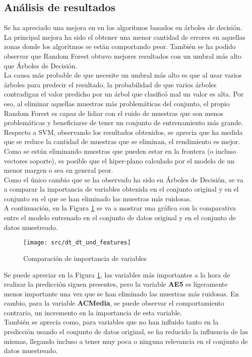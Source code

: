 \subsection{Análisis de resultados}
Se ha apreciado una mejora en en los algoritmos basados en árboles de decisión. La principal mejora ha sido el obtener una menor cantidad de errores en aquellas zonas donde los algoritmos se están comportando peor. También se ha podido observar que Random Forest obtuvo mejores resultados con un umbral más alto que Árboles de Decisión. \\
La causa más probable de que necesite un umbral más alto es que al usar varios árboles para predecir el resultado, la probabilidad de que varios árboles contradigan el valor predicho por un árbol que clasificó mal un valor es alta. Por eso, al eliminar aquellas muestras más problemáticas del conjunto, el propio Random Forest es capaz de lidiar con el ruido de muestras que son menos problemáticas y beneficiarse de tener un conjunto de entrenamiento más grande.\\
\linebreak
Respecto a SVM, observando los resultados obtenidos, se aprecia que ha medida que se reduce la cantidad de muestras que se eliminan, el rendimiento es mejor.
Como se están eliminando muestras que pueden estar en la frontera (o incluso vectores soporte), es posible que el hiper-plano calculado por el modelo de un menor margen o sea en general peor.\\
\linebreak
Como el único cambio que se ha observado ha sido en Árboles de Decisión, se va a comparar la importancia de variables obtenida en el conjunto original y en el conjunto en el que se han eliminado las muestras más ruidosas.\\
\clearpage
A continuación, en la Figura \ref{fig:cmp_fi_dt} se va a mostrar una gráfica con la comparativa entre el modelo entrenado en el conjunto de datos original y en el conjunto de datos muestreado.
\begin{figure}[H]
	\centering
	\texttt{[image: src/dt\_dt\_und\_features]}
	\caption{Comparación de importancia de variables}
	\label{fig:cmp_fi_dt}
\end{figure}
Se puede apreciar en la Figura \ref{fig:cmp_fi_dt}, las variables más importantes a la hora de realizar la predicción siguen presentes, pero la variable \textbf{AE5} es ligeramente menos importante una vez que se han eliminado las muestras más ruidosas. En cambio, para la variable \textbf{ACMedia}, se puede observar el comportamiento contrario, un incremento en la importancia de esta variable. \\
\linebreak
También se aprecia como, para variables que no han influido tanto en la predicción usando el conjunto de datos original, se ha reducido la influencia de las mismas, llegando incluso a tener muy poca o ninguna relevancia en el conjunto de datos muestreado.
